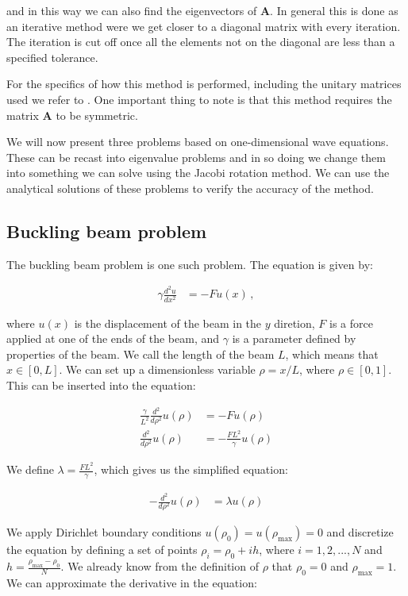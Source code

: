 \documentclass[reprint,english,notitlepage]{revtex4-1}  %
\begin{document}
and in this way we can also find the eigenvectors of \textbf{A}. In general this is done as an iterative method were we get closer to a diagonal matrix with every iteration. The iteration is cut off once all the elements not on the diagonal are less than a specified tolerance. 

For the specifics of how this method is performed, including the unitary matrices used we refer to \citep{Hjorth-Jensen2015}. One important thing to note is that this method requires the matrix \textbf{A} to be symmetric. 

We will now present three problems based on one-dimensional wave equations. These can be recast into eigenvalue problems and in so doing we change them into something we can solve using the Jacobi rotation method. We can use the analytical solutions of these problems to verify the accuracy of the method.


\subsection{Buckling beam problem} \label{sec:II:c}

The buckling beam problem is one such problem. The equation is given by:

\begin{align*}
\gamma \frac{d^2 u }{dx^2} &= -Fu(x) \, ,
\end{align*}

where $u(x)$ is the displacement of the beam in the $y$ diretion, $F$ is a force applied at one of the ends of the beam, and $\gamma$ is a parameter defined by properties of the beam. We call the length of the beam $L$, which means that $x\in [0,L]$. We can set up a dimensionless variable $\rho = x/L$, where $\rho \in [0,1]$. This can be inserted into the equation:

\begin{align*}
\frac{\gamma}{L^2} \frac{d^2  }{d\rho^2} u(\rho) &= -Fu(\rho) \\
\frac{d^2}{d\rho^2} u(\rho) &= -\frac{FL^2}{\gamma} u(\rho)
\end{align*}

We define $\lambda = \frac{FL^2}{\gamma}$, which gives us the simplified equation:

\begin{align*}
- \frac{d^2}{d\rho^2} u(\rho) &= \lambda u (\rho)
\end{align*}

We apply Dirichlet boundary conditions $u(\rho_0) = u(\rho_\text{max}) = 0$ and discretize the equation by defining a set of points $\rho_i = \rho_0 + ih$, where $i = 1,2,...,N$ and $h = \frac{\rho_\text{max} - \rho_0}{N}$. We already know from the definition of $\rho$ that $\rho_0 = 0$ and $\rho_\text{max} = 1$. We can approximate the derivative in the equation:
\end{document}
